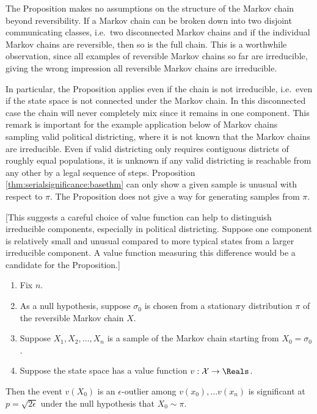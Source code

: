 \documentclass[12pt]{article}
\begin{document}
\begin{remark}
    The Proposition makes no assumptions on the structure of the Markov
    chain beyond reversibility.  If a Markov chain can be broken down
    into two disjoint communicating classes, i.e.\ two disconnected
    Markov chains and if the individual Markov chains are reversible,
    then so is the full chain.  This is a worthwhile observation, since all examples
    of reversible Markov chains so far are irreducible, giving the
    wrong impression all reversible Markov chains are irreducible.

    In particular, the Proposition applies even if the chain is not
    irreducible, i.e.\ even if the state space is not connected under
    the Markov chain.  In this disconnected case the chain will never
    completely mix since it remains in one component.  This remark is
    important for the example application below of Markov chains
    sampling valid political districting, where it is not known that the
    Markov chains are irreducible.  Even if valid districting only
    requires contiguous districts of roughly equal populations, it is
    unknown if any valid districting is reachable from any other by a
    legal sequence of steps.  Proposition~%
    \ref{thm:serialsignificance:basethm} can only show a given sample is
    unusual with respect to \( \pi \).  The Proposition does not give a
    way for generating samples from \( \pi \).

    [This suggests a careful choice of value function can help to
    distinguish irreducible components, especially in political
    districting.  Suppose one component is relatively small and unusual
    compared to more typical states from a larger irreducible component.
    A value function measuring this difference would be a candidate for
    the Proposition.]
\end{remark}

\begin{corollary}
    \label{thm:serialsignificance:sqrtepstest}
    \begin{enumerate}
        \item
            Fix \( n \).
        \item
            As a null hypothesis, suppose \( \sigma_0 \) is chosen from
            a stationary distribution \( \pi \) of the reversible Markov
            chain \( X \).
        \item
            Suppose \( X_1, X_2, \dots, X_n \) is a sample of the Markov
            chain starting from \( X_0 = \sigma_0 \).
        \item
            Suppose the state space has a value function \( v : \mathcal
            {X} \to \Reals \).
    \end{enumerate}
    Then the event \( v(X_0) \) is an \( \epsilon \)-outlier among \( v(x_0),
    \dots v(x_n ) \) is significant at \( p = \sqrt{2\epsilon} \) under
    the null hypothesis that \( X_0 \sim \pi \).
\end{corollary}
\end{document}
